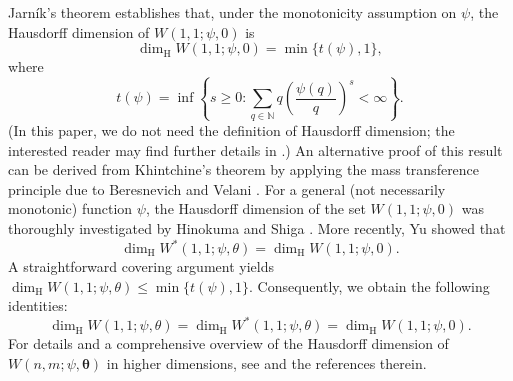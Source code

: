 \documentclass[12pt,a4paper,twoside]{article}
\begin{document}
Jarn\'{i}k's theorem \cite{J31} establishes that, under the monotonicity assumption on $\psi$, the Hausdorff dimension of $W(1,1;\psi,0)$ is
\[
\dim_{\mathrm{H}} W(1,1;\psi,0) = \min\{t(\psi),1\},
\]
where
\[
t(\psi) = \inf\left\{s \ge 0 : \sum_{q \in \mathbb{N}} q \left( \frac{\psi(q)}{q} \right)^s < \infty \right\}.
\]
(In this paper, we do not need the definition of Hausdorff dimension; the interested reader may find further details in \cite{F14}.) An alternative proof of this result can be derived from Khintchine's theorem by applying the mass transference principle due to Beresnevich and Velani \cite{BV06}. For a general (not necessarily monotonic) function $\psi$, the Hausdorff dimension of the set $W(1,1;\psi,0)$ was thoroughly investigated by Hinokuma and Shiga \cite{HS96}. More recently, Yu \cite{Y19} showed that
\[
\dim_{\mathrm{H}} W^{\ast}(1,1;\psi,\theta) = \dim_{\mathrm{H}} W(1,1;\psi,0).
\]
A straightforward covering argument yields $\dim_{\mathrm{H}} W(1,1;\psi,\theta) \le \min\{t(\psi),1\}$. Consequently, we obtain the following identities:
\[
\dim_{\mathrm{H}} W(1,1;\psi,\theta) = \dim_{\mathrm{H}} W^{\ast}(1,1;\psi,\theta) = \dim_{\mathrm{H}} W(1,1;\psi,0).
\]
For details and a comprehensive overview of the Hausdorff dimension of $ W(n,m;\psi,{\bm \theta})$ in higher dimensions, see  \cite{WW21,BV26} and the references therein.




 \medskip
\end{document}

